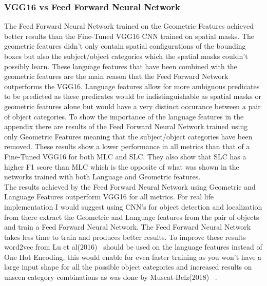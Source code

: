 \documentclass{csfyp}
\newcommand\tab[1][1cm]{\hspace*{#1}}
\begin{document}
\subsubsection{VGG16 vs Feed Forward Neural Network}
The Feed Forward Neural Network trained on the Geometric Features achieved better results than the Fine-Tuned VGG16 CNN trained on spatial masks. The geometric features didn't only contain spatial configurations of the bounding boxes but also the subject/object categories which the spatial masks couldn't possibly learn. These language features that have been combined with the geometric features are the main reason that the Feed Forward Network outperforms the VGG16. Language features allow for more ambiguous predicates to be predicted as these predicates would be indistinguishable as spatial masks or geometric features alone but would have a very distinct occurance between a pair of object categories. To show the importance of the language features in the appendix there are results of the Feed Forward Neural Network trained using only Geometric Features meaning that the subject/object categories have been removed. These results show a lower performance in all metrics than that of a Fine-Tuned VGG16 for both MLC and SLC. They also show that SLC has a higher F1 score than MLC which is the opposite of what was shown in the networks trained with both Language and Geometric features.
\\
\tab The results achieved by the Feed Forward Neural Network using Geometric and Language Features outperform VGG16 for all metrics. For real life implementation I would suggest using CNN's for object detection and localization from there extract the Geometric and Language features from the pair of objects and train a Feed Forward Neural Network. The Feed Forward Neural Network takes less time to train and produces better results. To improve these results word2vec from Lu et al(2016)~\cite{lu2016visual} should be used on the language features instead of One Hot Encoding, this would enable for even faster training as you won't have a large input shape for all the possible object categories and increased results on unseen category combinations as was done by Muscat-Belz(2018)~\cite{belz-etal-2018-spatialvoc2k} .
\end{document}
